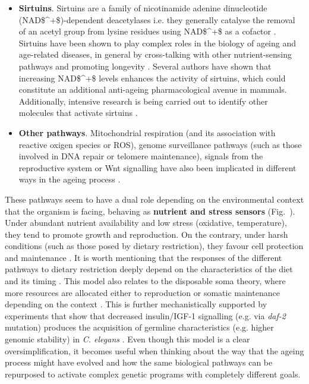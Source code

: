 \begin{itemize}
	\item \textbf{Sirtuins}. Sirtuins are a family of nicotinamide adenine dinucleotide (\acrshort{NAD$^+$})-dependent deacetylases i.e. they generally catalyse the removal of an acetyl group from lysine residues using \acrshort{NAD$^+$} as a cofactor \cite{Bonkowski2016}. Sirtuins have been shown to play complex roles in the biology of ageing and age-related diseases, in general by cross-talking with other nutrient-sensing pathways and promoting longevity \cite{Kenyon2010,Bonkowski2016}. Several authors have shown that increasing \acrshort{NAD$^+$} levels enhances the activity of sirtuins, which could constitute an additional anti-ageing pharmacological avenue in mammals. Additionally, intensive research is being carried out to identify other molecules that activate sirtuins \cite{Bonkowski2016}.
	
	\item \textbf{Other pathways}. Mitochondrial respiration (and its association with reactive oxigen species or \acrshort{ROS}), genome surveillance pathways (such as those involved in DNA repair or telomere maintenance), signals from the reproductive system or Wnt signalling have also been implicated in different ways in the ageing process \cite{Kenyon2010,Greer2008, Lezzerini2014}.
	
\end{itemize}

\bigskip

These pathways seem to have a dual role depending on the environmental context that the organism is facing, behaving as \textbf{nutrient and stress sensors} (Fig.~). Under abundant nutrient availability and low stress (oxidative, temperature), they tend to promote growth and reproduction. On the contrary, under harsh conditions (such as those posed by dietary restriction), they favour cell protection and maintenance \cite{Kenyon2005,Kenyon2010}. It is worth mentioning that the responses of the different pathways to dietary restriction deeply depend on the characteristics of the diet and its timing \cite{Kenyon2010}. This model also relates to the disposable soma theory, where more resources are allocated either to reproduction or somatic maintenance depending on the context \cite{Kirkwood1977,Kirkwood1991}. This is further mechanistically supported by experiments that show that decreased insulin/IGF-1 signalling (e.g. via \textit{daf-2} mutation) produces the acquisition of germline characteristics (e.g. higher genomic stability) in \textit{C. elegans} \cite{Curran2009}. Even though this model is a clear oversimplification, it becomes useful when thinking about the way that the ageing process might have evolved and how the same biological pathways can be repurposed to activate complex genetic programs with completely different goals.

